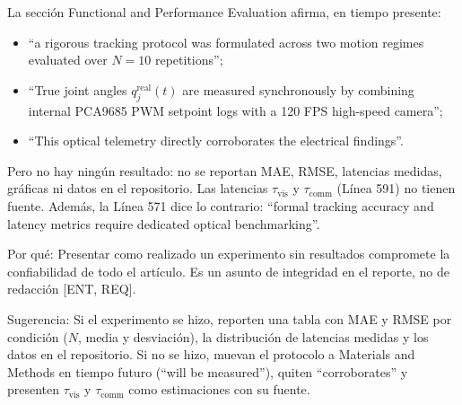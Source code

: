 \documentclass{LabDSTresponse}
\begin{document}
{La sección Functional and Performance Evaluation afirma, en tiempo presente:
\begin{itemize}
    \item “a rigorous tracking protocol was formulated across two motion regimes evaluated over $N = 10$ repetitions”;
    \item “True joint angles $q_j^{\text{real}}(t)$ are measured synchronously by combining internal PCA9685 PWM setpoint logs with a 120 FPS high-speed camera”;
    \item “This optical telemetry directly corroborates the electrical findings”.
\end{itemize}
Pero no hay ningún resultado: no se reportan MAE, RMSE, latencias medidas, gráficas ni datos en el repositorio. Las latencias $\tau_{\text{vis}}$ y $\tau_{\text{comm}}$ (Línea 591) no tienen fuente. Además, la Línea 571 dice lo contrario: “formal tracking accuracy and latency metrics require dedicated optical benchmarking”.

Por qué: Presentar como realizado un experimento sin resultados compromete la confiabilidad de todo el artículo. Es un asunto de integridad en el reporte, no de redacción [ENT, REQ].

Sugerencia: Si el experimento se hizo, reporten una tabla con MAE y RMSE por condición ($N$, media y desviación), la distribución de latencias medidas y los datos en el repositorio. Si no se hizo, muevan el protocolo a Materials and Methods en tiempo futuro (“will be measured”), quiten “corroborates” y presenten $\tau_{\text{vis}}$ y $\tau_{\text{comm}}$ como estimaciones con su fuente.}
\end{document}
